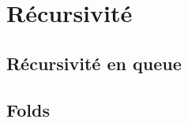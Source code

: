 \section{Récursivité}
\label{sec:recursivity}

\subsection{ Récursivité en queue}

\subsection{ Folds}
